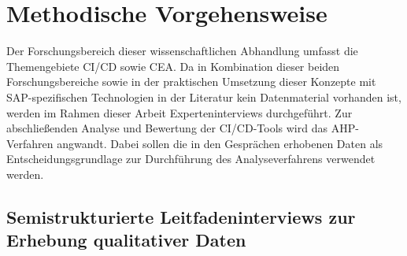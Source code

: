 \section{Methodische Vorgehensweise}
Der Forschungsbereich dieser wissenschaftlichen Abhandlung umfasst die Themengebiete CI/CD sowie CEA. Da in Kombination dieser beiden Forschungsbereiche sowie in der praktischen Umsetzung dieser Konzepte mit SAP-spezifischen Technologien in der Literatur kein Datenmaterial vorhanden ist, werden im Rahmen dieser Arbeit Experteninterviews durchgeführt. Zur abschließenden Analyse und Bewertung der CI/CD-Tools wird das AHP-Verfahren angwandt. Dabei sollen die in den Gesprächen erhobenen Daten als Entscheidungsgrundlage zur Durchführung des Analyseverfahrens verwendet werden. 
\subsection{Semistrukturierte Leitfadeninterviews zur Erhebung qualitativer Daten}
